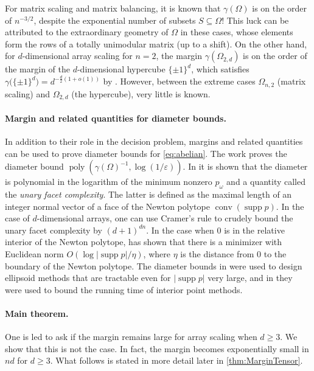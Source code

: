 \documentclass[10pt,a4paper]{article}
\numberwithin{equation}{section}
\newcommand{\poly}{\operatorname{poly}}
\DeclareMathOperator{\conv}{conv}
\DeclareMathOperator{\supp}{supp}
\newcommand{\eps}{\varepsilon}
\begin{document}
For matrix scaling and matrix balancing, it is known that $\gamma(\Omega)$ is on the order of $n^{-3/2}$, despite the exponential number of subsets $S \subseteq \Omega$! This luck can be attributed to the extraordinary geometry of $\Omega$ in these cases, whose elements form the rows of a totally unimodular matrix (up to a shift).
On the other hand, for $d$-dimensional array scaling for $n = 2$, the margin $\gamma(\Omega_{2,d})$ is on the order of the margin of the $d$-dimensional hypercube $\{\pm 1\}^d$, which satisfies $\gamma \big( \{\pm 1\}^d \big)=d^{-\frac{d}{2}(1 + o(1))}$ by \cite{alon1997anti}.
However, between the extreme cases $\Omega_{n,2}$ (matrix scaling) and $\Omega_{2,d}$ (the hypercube), very little is known.


\paragraph{Margin and related quantities for diameter bounds.}
In addition to their role in the decision problem, margins and related quantities can be used to prove diameter bounds for \cref{eq:abelian}. The work \cite{gradflow} proves the diameter bound $\poly(\gamma(\Omega)^{-1}, \log(1/\eps))$. In \cite{straszak2017computing} it is shown that the diameter is polynomial in the logarithm of the minimum nonzero $p_\omega$ and a quantity called the \emph{unary facet complexity}. The latter is defined as the maximal length of an integer normal vector of a face of the Newton polytope $\conv(\supp p)$. In the case of $d$-dimensional arrays, one can use Cramer's rule to crudely bound the unary facet complexity by $(d + 1)^{dn}$. In the case when $0$ is in the relative interior of the Newton polytope, \cite{singh2014entropy} has shown that there is a minimizer with Euclidean norm $O(\log |\supp p|/\eta)$, where $\eta$ is the distance from $0$ to the boundary of the Newton polytope. The diameter bounds in \cite{singh2014entropy,straszak2017computing} were used to design ellipsoid methods that are tractable even for $|\supp p|$ very large, and in \cite{burgisser2020interior} they were used to bound the running time of interior point methods.

\paragraph{Main theorem.}
One is led to ask if the margin remains large for array scaling when $d \geq 3$. We show that this is not the case. In fact, the margin becomes exponentially small in $nd$ for $d \geq 3$. What follows is stated in more detail later in \cref{thm:MarginTensor}.
\end{document}
